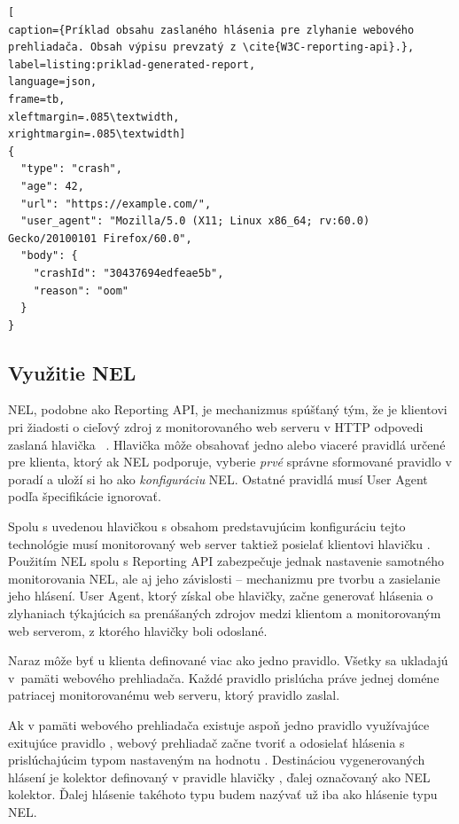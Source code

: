 \begin{center}
\centering
\begin{lstlisting}[
caption={Príklad obsahu zaslaného hlásenia pre zlyhanie webového prehliadača. Obsah výpisu prevzatý z \cite{W3C-reporting-api}.},
label=listing:priklad-generated-report, 
language=json, 
frame=tb,
xleftmargin=.085\textwidth, 
xrightmargin=.085\textwidth]
{
  "type": "crash",
  "age": 42,
  "url": "https://example.com/",
  "user_agent": "Mozilla/5.0 (X11; Linux x86_64; rv:60.0) Gecko/20100101 Firefox/60.0",
  "body": {
    "crashId": "30437694edfeae5b",
    "reason": "oom"
  }
}
\end{lstlisting}
\end{center}

\pagebreak

\subsection{Využitie NEL}
\label{network-error-logging-spec}

NEL, podobne ako Reporting API, je mechanizmus spúšťaný tým, že je klientovi pri žiadosti o cieľový zdroj z monitorovaného web serveru v HTTP odpovedi zaslaná hlavička \mbox{ \cite{W3C-NEL}}.
Hlavička  môže obsahovať jedno alebo viaceré pravidlá určené pre klienta, ktorý ak NEL podporuje, vyberie \textit{prvé} správne sformované pravidlo v poradí a uloží si ho ako \emph{konfiguráciu} NEL.
Ostatné pravidlá musí User Agent podľa špecifikácie ignorovať.

Spolu s uvedenou hlavičkou s obsahom predstavujúcim konfiguráciu tejto technológie musí monitorovaný web server taktiež posielať klientovi hlavičku . 
Použitím NEL spolu s Reporting API zabezpečuje jednak nastavenie samotného monitorovania NEL, ale aj jeho závislosti -- mechanizmu pre tvorbu a zasielanie jeho hlásení.
User Agent, ktorý získal obe hlavičky, začne generovať hlásenia o zlyhaniach týkajúcich sa prenášaných zdrojov medzi klientom a monitorovaným web serverom, z ktorého hlavičky boli odoslané. 

Naraz môže byť u klienta definované viac ako jedno pravidlo.
Všetky sa ukladajú \mbox{v pamäti} webového prehliadača.
Každé pravidlo prislúcha práve jednej doméne patriacej monitorovanému web serveru, ktorý pravidlo zaslal. 

Ak v pamäti webového prehliadača existuje aspoň jedno pravidlo  využívajúce exitujúce pravidlo , 
webový prehliadač začne tvoriť a odosielať hlásenia s prislúchajúcim typom nastaveným na hodnotu . 
Destináciou vygenerovaných hlásení je kolektor definovaný v pravidle hlavičky , ďalej označovaný ako NEL kolektor. 
Ďalej hlásenie takéhoto typu budem nazývať už iba ako hlásenie typu NEL.

